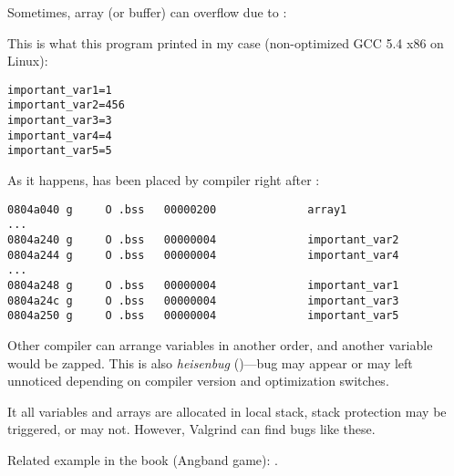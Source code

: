 \label{GlobalArraysOverflowHeisenbug}

Sometimes, array (or buffer) can overflow due to :



This is what this program printed in my case (non-optimized GCC 5.4 x86 on Linux):

\begin{lstlisting}
important_var1=1
important_var2=456
important_var3=3
important_var4=4
important_var5=5
\end{lstlisting}

As it happens,  has been placed by compiler right after :

\begin{lstlisting}[caption=objdump -x]
0804a040 g     O .bss   00000200              array1
...
0804a240 g     O .bss   00000004              important_var2
0804a244 g     O .bss   00000004              important_var4
...
0804a248 g     O .bss   00000004              important_var1
0804a24c g     O .bss   00000004              important_var3
0804a250 g     O .bss   00000004              important_var5
\end{lstlisting}

Other compiler can arrange variables in another order, and another variable would be zapped.
This is also \textit{heisenbug} ()---bug may appear or may left unnoticed
depending on compiler version and optimization switches.

It all variables and arrays are allocated in local stack, stack protection may be triggered, or may not.
However, Valgrind can find bugs like these.

Related example in the book (Angband game): .

